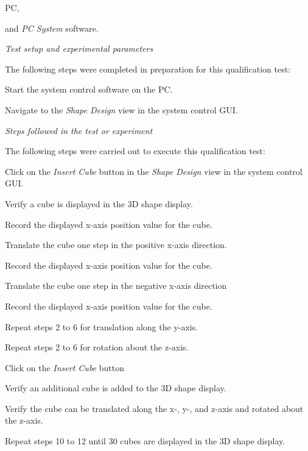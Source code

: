 \begin{compactitem}
	\item PC,
	\item and \textit{PC System} software.
\end{compactitem}

\textit{Test setup and experimental parameters}

The following steps were completed in preparation for this qualification test:
\begin{compactitem}
	\item Start the system control software on the PC.
	\item Navigate to the \textit{Shape Design} view in the system control GUI.
\end{compactitem}

\textit{Steps followed in the test or experiment}

The following steps were carried out to execute this qualification test:

\begin{compactenum}
	\item Click on the \textit{Insert Cube} button in the \textit{Shape Design} view in the system control GUI.
	\item Verify a cube is displayed in the 3D shape display.
	\item Record the displayed x-axis position value for the cube.
	\item Translate the cube one step in the positive x-axis direction.
	\item Record the displayed x-axis position value for the cube.
	\item Translate the cube one step in the negative x-axis direction
	\item Record the displayed x-axis position value for the cube.
	\item Repeat steps 2 to 6 for translation along the y-axis.
	\item Repeat steps 2 to 6 for rotation about the z-axis.
	\item Click on the \textit{Insert Cube} button
	\item Verify an additional cube is added to the 3D shape display.
	\item Verify the cube can be translated along the x-, y-, and z-axis and rotated about the z-axis.
	\item Repeat steps 10 to 12 until 30 cubes are displayed in the 3D shape display.
\end{compactenum}

